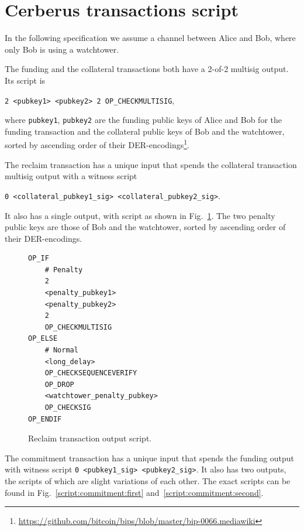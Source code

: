 \documentclass[runningheads]{llncs}
\newcommand{\sys}{\textsc{Cerberus}\xspace}
\begin{document}

\iffalse
\section{Cerberus transactions script}
\label{sec:script}

In the following specification we assume a channel between Alice and Bob, where only Bob is using a watchtower.

The funding and the collateral transactions both have a 2-of-2 multisig output. Its script is

\texttt{2 <pubkey1> <pubkey2> 2 OP\_CHECKMULTISIG},

where \texttt{pubkey1}, \texttt{pubkey2} are the funding public keys of Alice and Bob for the funding transaction and the collateral public keys of Bob and the watchtower, sorted by ascending order of their DER-encodings\footnote{\url{https://github.com/bitcoin/bips/blob/master/bip-0066.mediawiki}}.

The reclaim transaction has a unique input that spends the collateral transaction multisig output with a witness script

\texttt{0 <collateral\_pubkey1\_sig> <collateral\_pubkey2\_sig>}.

It also has a single output, with script as shown in Fig.~\ref{script:claim}. The two penalty public keys are those of Bob and the watchtower, sorted by ascending order of their DER-encodings.

\begin{figure}[ht!]
    \begin{verbatim}
OP_IF
    # Penalty
    2
    <penalty_pubkey1>
    <penalty_pubkey2>
    2
    OP_CHECKMULTISIG
OP_ELSE
    # Normal
    <long_delay>
    OP_CHECKSEQUENCEVERIFY
    OP_DROP
    <watchtower_penalty_pubkey>
    OP_CHECKSIG
OP_ENDIF
    \end{verbatim}
\caption{Reclaim transaction output script.}
\label{script:claim}
\end{figure}

The commitment transaction has a unique input that spends the funding output with witness script \texttt{0 <pubkey1\_sig> <pubkey2\_sig>}. It also has two outputs, the scripts of which are slight variations of each other. The exact scripts can be found in Fig.~\ref{script:commitment:first} and~\ref{script:commitment:second}.
\end{document}
